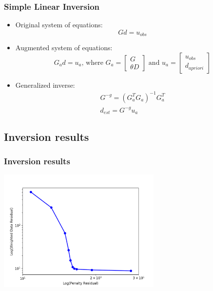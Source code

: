 \documentclass{beamer}
\begin{document}
\begin{frame}
  \frametitle{Simple Linear Inversion}

  \begin{itemize}
  \item Original system of equations:
    \begin{equation}
      G d = u_{obs}
    \end{equation}

  \item Augmented system of equations:
    \begin{equation}
      G_a d = u_a \text{, where } 
      G_a = \left[ \begin{array}{c} G \\ \theta D \end{array} \right]
      \text{ and }
      u_a = \left[ \begin{array}{c} u_{obs} \\ d_{apriori} \end{array} \right]
    \end{equation}
    
  \item Generalized inverse:
    \begin{gather}
      G^{-g} = \left( G_a^T G_a \right)^{-1} G_a^T \\
      d_{est} = G^{-g} u_a
    \end{gather}
  \end{itemize}
  
\end{frame}


\subsection{Inversion results}

\begin{frame}
  \frametitle{Inversion results}

  \vfill
  \begin{center}
    \includegraphics[height=6.1cm]{figs/subduction3d_step07_inverse_curve}
  \end{center}
  \vfill
  
\end{frame}
\end{document}
